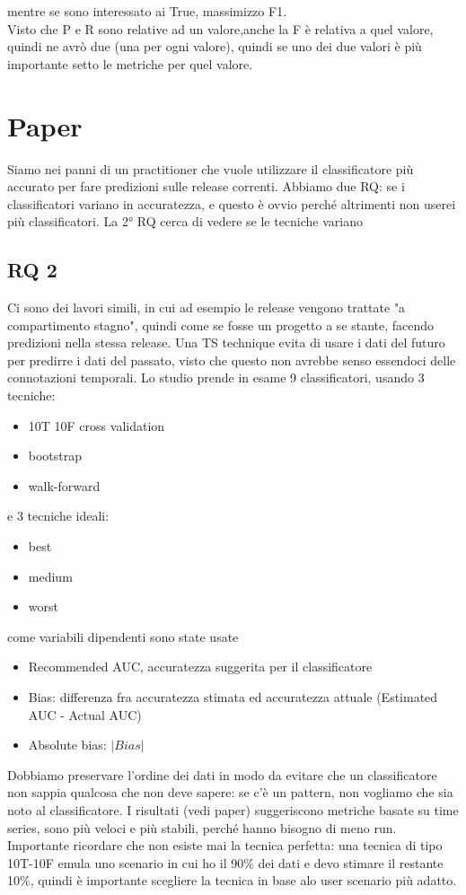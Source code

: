 \documentclass{article}
\begin{document}
mentre se sono interessato ai True, massimizzo F1.\\ Visto che P e R sono relative ad un valore,anche la F è relativa a quel valore, quindi ne avrò due (una per ogni valore), quindi se uno dei due valori è più importante setto le metriche per quel valore.
\section{Paper}
Siamo nei panni di un practitioner che vuole utilizzare il classificatore più accurato per fare predizioni sulle release correnti. Abbiamo due RQ: se i classificatori variano in accuratezza, e questo è ovvio perché altrimenti non userei più classificatori. La 2° RQ cerca di vedere se le tecniche variano
\subsection{RQ 2}
Ci sono dei lavori simili, in cui ad esempio le release vengono trattate "a compartimento stagno", quindi come se fosse un progetto a se stante, facendo predizioni nella stessa release. Una TS technique evita di usare i dati del futuro per predirre i dati del passato, visto che questo non avrebbe senso essendoci delle connotazioni temporali. Lo studio prende in esame 9 classificatori, usando 3 tecniche:
\begin{itemize}
\item 10T 10F cross validation
\item bootstrap
\item walk-forward
\end{itemize}
e 3 tecniche ideali:
\begin{itemize}
\item best
\item medium
\item worst
\end{itemize}
come variabili dipendenti sono state usate
\begin{itemize}
\item Recommended AUC, accuratezza suggerita per il classificatore
\item Bias: differenza fra accuratezza stimata ed accuratezza attuale (Estimated AUC - Actual AUC)
\item Absolute bias: $|Bias|$
\end{itemize}
Dobbiamo preservare l'ordine dei dati in modo da evitare che un classificatore non sappia qualcosa che non deve sapere: se c'è un pattern, non vogliamo che sia noto al classificatore. I risultati (vedi paper) suggeriscono metriche basate su time series, sono più veloci e più stabili, perché hanno bisogno di meno run. Importante ricordare che non esiste mai la tecnica perfetta: una tecnica di tipo 10T-10F emula uno scenario in cui ho il 90\% dei dati e devo stimare il restante 10\%, quindi è importante scegliere la tecnica in base alo user scenario più adatto. 
\end{document}
